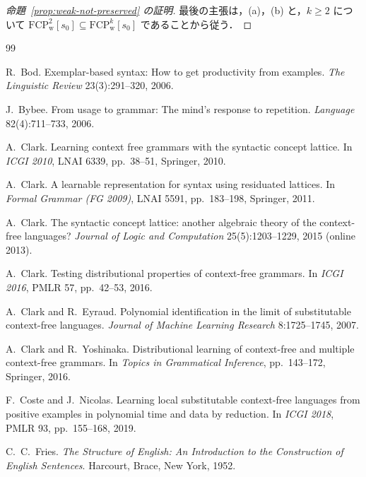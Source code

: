 \documentclass[11pt,a4paper]{ltjsarticle}
\numberwithin{equation}{section}
\theoremstyle{plain}
\theoremstyle{definition}
\theoremstyle{remark}
\theoremstyle{plain}
\newcommand{\tFCP}[3]{\mathrm{FCP}^{#1}_{\mathrm{#2}}[#3]}
\begin{document}
\begin{proof}[命題~\ref{prop:weak-not-preserved} の証明]
最後の主張は，(a)，(b) と，$k\ge2$ について $\tFCP2{w}{s_0}\subseteq\tFCP{k}{w}{s_0}$ であることから従う．
\end{proof}

\begin{thebibliography}{99}

R.~Bod.
Exemplar-based syntax: How to get productivity from examples.
\textit{The Linguistic Review} 23(3):291--320, 2006.

J.~Bybee.
From usage to grammar: The mind's response to repetition.
\textit{Language} 82(4):711--733, 2006.

A.~Clark.
Learning context free grammars with the syntactic concept lattice.
In \textit{ICGI 2010}, LNAI 6339, pp.~38--51, Springer, 2010.

A.~Clark.
A learnable representation for syntax using residuated lattices.
In \textit{Formal Grammar (FG 2009)}, LNAI 5591, pp.~183--198, Springer,
2011.

A.~Clark.
The syntactic concept lattice: another algebraic theory of the
context-free languages?
\textit{Journal of Logic and Computation} 25(5):1203--1229, 2015
(online 2013).

A.~Clark.
Testing distributional properties of context-free grammars.
In \textit{ICGI 2016}, PMLR 57, pp.~42--53, 2016.

A.~Clark and R.~Eyraud.
Polynomial identification in the limit of substitutable context-free
languages.
\textit{Journal of Machine Learning Research} 8:1725--1745, 2007.

A.~Clark and R.~Yoshinaka.
Distributional learning of context-free and multiple context-free
grammars.
In \textit{Topics in Grammatical Inference}, pp.~143--172, Springer, 2016.

F.~Coste and J.~Nicolas.
Learning local substitutable context-free languages from positive examples
in polynomial time and data by reduction.
In \textit{ICGI 2018}, PMLR 93, pp.~155--168, 2019.

C.~C.~Fries.
\textit{The Structure of English: An Introduction to the Construction of
English Sentences}.
Harcourt, Brace, New York, 1952.


\end{thebibliography}
\end{document}
